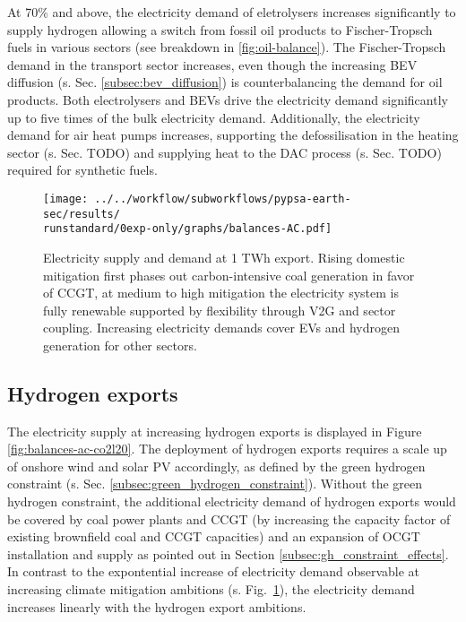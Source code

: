 At 70\% and above, the electricity demand of eletrolysers increases significantly to supply hydrogen allowing a switch from fossil oil products to Fischer-Tropsch fuels in various sectors (see breakdown in \ref{fig:oil-balance}). 
The Fischer-Tropsch demand in the transport sector increases, even though the increasing BEV diffusion (s. Sec. \ref{subsec:bev_diffusion}) is counterbalancing the demand for oil products. 
Both electrolysers and BEVs drive the electricity demand significantly up to five times of the bulk electricity demand. 
Additionally, the electricity demand for air heat pumps increases, supporting the defossilisation in the heating sector (s. Sec. TODO) and supplying heat to the DAC process (s. Sec. TODO) required for synthetic fuels.


\begin{figure}[h!]
    \centering
    \texttt{[image: ../../workflow/subworkflows/pypsa-earth-sec/results/\\runstandard/0exp-only/graphs/balances-AC.pdf]}
    \caption{Electricity supply and demand at 1 TWh export. Rising domestic mitigation first phases out carbon-intensive coal generation in favor of CCGT, at medium to high mitigation the electricity system is fully renewable supported by flexibility through V2G and sector coupling. Increasing electricity demands cover EVs and hydrogen generation for other sectors.}
    \label{fig:balances-ac-0exp}
\end{figure}

\subsection{Hydrogen exports}
\label{subsec:increase_h2}

The electricity supply at increasing hydrogen exports is displayed in Figure \ref{fig:balances-ac-co2l20}. The deployment of hydrogen exports requires a scale up of onshore wind and solar PV accordingly, as defined by the green hydrogen constraint (s. Sec. \ref{subsec:green_hydrogen_constraint}).
Without the green hydrogen constraint, the additional electricity demand of hydrogen exports would be covered by coal power plants and CCGT (by increasing the capacity factor of existing brownfield coal and CCGT capacities) and an expansion of OCGT installation and supply as pointed out in Section \ref{subsec:gh_constraint_effects}.
In contrast to the expontential increase of electricity demand observable at increasing climate mitigation ambitions (s. Fig.~\ref{fig:balances-ac-0exp}), the electricity demand increases linearly with the hydrogen export ambitions.

